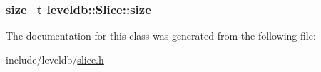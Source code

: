 \subsubsection[{size\+\_\+}]{\setlength{\rightskip}{0pt plus 5cm}size\+\_\+t leveldb\+::\+Slice\+::size\+\_\+\hspace{0.3cm}{\ttfamily [private]}}\label{classleveldb_1_1_slice_a5df3db41919d1700c5e8d95f0e40d1ca}


The documentation for this class was generated from the following file\+:\begin{DoxyCompactItemize}
\item 
include/leveldb/\hyperlink{slice_8h}{slice.\+h}\end{DoxyCompactItemize}

